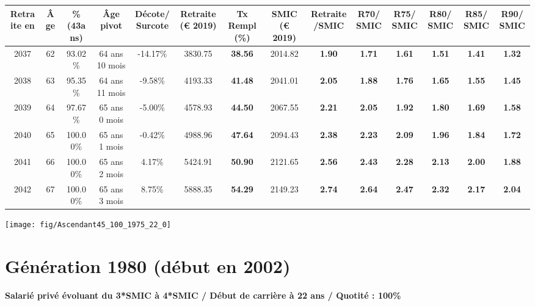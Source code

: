 \begin{adjustbox}{max width=\textwidth} 
\begin{tabular}[htb]{|c|c||c|c|c||c|c||c|c||c|c|c|c|c|} 
\hline 
 Retraite en &  Âge &  \%(43ans) &  Âge pivot &  Décote/Surcote &  Retraite (\euro{} 2019) &  Tx Rempl(\%) &  SMIC (\euro{} 2019) &  Retraite/SMIC &  R70/SMIC &  R75/SMIC &  R80/SMIC &  R85/SMIC &  R90/SMIC \\ 
\hline \hline 
 2037 &  62 &  93.02\% &  64 ans 10 mois &  -14.17\% &  3830.75 &  {\bf 38.56} &  2014.82 &  {\bf 1.90} &  {\bf 1.71} &  {\bf 1.61} &  {\bf 1.51} &  {\bf 1.41} &  {\bf 1.32} \\ 
\hline 
 2038 &  63 &  95.35\% &  64 ans 11 mois &  -9.58\% &  4193.33 &  {\bf 41.48} &  2041.01 &  {\bf 2.05} &  {\bf 1.88} &  {\bf 1.76} &  {\bf 1.65} &  {\bf 1.55} &  {\bf 1.45} \\ 
\hline 
 2039 &  64 &  97.67\% &  65 ans 0 mois &  -5.00\% &  4578.93 &  {\bf 44.50} &  2067.55 &  {\bf 2.21} &  {\bf 2.05} &  {\bf 1.92} &  {\bf 1.80} &  {\bf 1.69} &  {\bf 1.58} \\ 
\hline 
 2040 &  65 &  100.00\% &  65 ans 1 mois &  -0.42\% &  4988.96 &  {\bf 47.64} &  2094.43 &  {\bf 2.38} &  {\bf 2.23} &  {\bf 2.09} &  {\bf 1.96} &  {\bf 1.84} &  {\bf 1.72} \\ 
\hline 
 2041 &  66 &  100.00\% &  65 ans 2 mois &  4.17\% &  5424.91 &  {\bf 50.90} &  2121.65 &  {\bf 2.56} &  {\bf 2.43} &  {\bf 2.28} &  {\bf 2.13} &  {\bf 2.00} &  {\bf 1.88} \\ 
\hline 
 2042 &  67 &  100.00\% &  65 ans 3 mois &  8.75\% &  5888.35 &  {\bf 54.29} &  2149.23 &  {\bf 2.74} &  {\bf 2.64} &  {\bf 2.47} &  {\bf 2.32} &  {\bf 2.17} &  {\bf 2.04} \\ 
\hline 
\hline 
\end{tabular} 
\end{adjustbox} 
 
 \vspace{0.1cm} 

 {\hspace{-2.2cm}\texttt{[image: fig/Ascendant45\_100\_1975\_22\_0]}} 

\newpage 
 
\section{Génération 1980 (début en 2002)\label{Ascendant45_100_1980_22_0}} 
 
{\bf \noindent Salarié privé évoluant du 3*SMIC à 4*SMIC / Début de carrière à 22 ans / Quotité : 100\%}  ~ 

